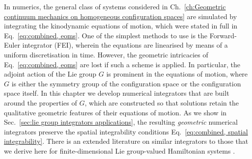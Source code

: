 In numerics, the general class of systems considered in Ch.~\ref{ch:Geometric continuum mechanics on homogeneous configuration spaces} are simulated by integrating the kinodynamic equations of motion, which were stated in full in Eq.~\ref{eq:combined, eoms}. One of the simplest methods to use is the Forward-Euler integrator (FEI), wherein the equations are linearised by means of a uniform discretisation in time. However, the geometric intricacies of Eq.~\ref{eq:combined, eoms} are lost if such a scheme is applied. In particular, the adjoint action of the Lie group $G$ is prominent in the equations of motion, where $G$ is either the symmetry group of the configuration space or the configuration space itself. In this chapter we develop numerical integrators that are built around the properties of $G$, which are constructed so that solutions retain the qualitative geometric features of their equations of motion. As we show in Sec.~\ref{sec:lie group integrators applications}, the resulting \textit{geometric} numerical integrators preserve the spatial integrability conditions Eq.~\ref{eq:combined, spatial integrability}. There is an extended literature on similar integrators to those that we derive here for finite-dimensional Lie group-valued Hamiltonian systems \citep{munthe-kaasHighOrderRungeKutta1999, buddGeometricIntegrationNumerical1999, engoNumericalIntegrationLie2001}.

